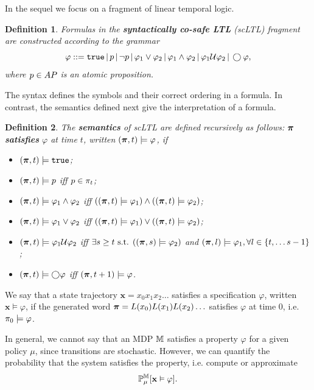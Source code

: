 \documentclass[conference]{IEEEtran}
\newtheorem{definition}{Definition}
\begin{document}
In the sequel we focus on a fragment of linear temporal logic.
\begin{definition}
  \label{def:gdtl-syntax}
  Formulas in the \textbf{syntactically co-safe LTL} (scLTL) fragment are constructed according to the grammar
  \begin{equation}
    \label{eq:scLTL}
    \varphi ::=  \True \, |\,p \, |\, \lnot p \, |\, \varphi_1 \vee\varphi_2  \, |\, \varphi_1 \land \varphi_2 \, |\, \varphi_1 \ltluntil \varphi_2 \, |\, \ltlnext \varphi,
  \end{equation}
  where $p\in AP$ is an atomic proposition.
\end{definition}
The syntax defines the symbols and their correct ordering in a formula. In contrast, the semantics defined next give the interpretation of a formula.
\begin{definition}
 The \textbf{semantics} of scLTL are defined recursively as follows: $\boldsymbol{\pi}$ \textbf{satisfies} $\varphi$ at time $t$, written $(\boldsymbol{\pi}, t) \models \varphi$, if
 \begin{itemize}
    \item $(\boldsymbol{\pi}, t) \models \texttt{true}$;
    \item $(\boldsymbol{\pi}, t) \models p$ iff $p \in \pi_t$;
    \item $(\boldsymbol{\pi}, t) \models \varphi_1 \land  \varphi_2  $ iff $ ( (\boldsymbol{\pi}, t) \models \varphi_1 ) \land ( (\boldsymbol{\pi}, t) \models \varphi_2 ) $;
    \item $(\boldsymbol{\pi}, t) \models \varphi_1 \lor  \varphi_2  $ iff $ ( (\boldsymbol{\pi}, t) \models \varphi_1 ) \lor ( (\boldsymbol{\pi}, t) \models \varphi_2 ) $;
    \item $(\boldsymbol{\pi}, t) \models  \varphi_1 \mathcal{U} \varphi_2 $ iff $\exists s \geq t \text{ s.t. } ((\boldsymbol{\pi}, s) \models \varphi_2 ) $ and $(\boldsymbol{\pi}, l) \models \varphi_1, \forall l \in \{t, \ldots s-1\}$;
    \item $(\boldsymbol{\pi}, t) \models \bigcirc \varphi$ iff $(\boldsymbol{\pi}, t+1) \models \varphi$.
 \end{itemize}

\end{definition}
We say that a state trajectory $\mathbf{x} = x_0 x_1 x_2 \ldots$ satisfies a specification $\varphi$, written $\mathbf{x} \models \varphi$, if the generated word $\boldsymbol{\pi} =L(x_0) L(x_1) L(x_2) \ldots$ satisfies $\varphi$ at time 0, i.e. $\pi_0 \models \varphi$.

In general, we cannot say that an MDP $\mathbb{M}$ satisfies a property $\varphi$ for a given policy $\mu$, since transitions are stochastic. However, we can quantify the probability that the system satisfies the property, i.e. compute or approximate
\begin{equation}
  \label{eq:probLTL}
  \mathbb P_{\mu}^\MDP[\mathbf x \vDash \varphi ].
\end{equation}
\end{document}
